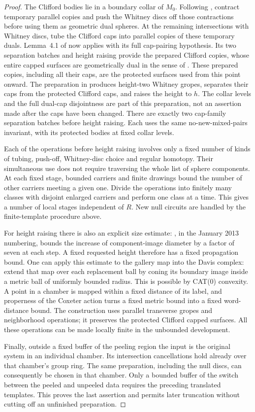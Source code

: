\documentclass[11pt]{article}
\theoremstyle{definition}
\theoremstyle{remark}
\begin{document}
\begin{proof}
The Clifford bodies lie in a boundary collar of $M_0$.  Following
\cite[Section~5]{PRT}, contract temporary parallel copies and push the
Whitney discs off those contractions before using them as geometric
dual spheres.  At the remaining intersections with Whitney discs,
tube the Clifford caps into parallel copies of these temporary duals.
Lemma~4.1 of \cite{PRT}
now applies with its full cap-pairing hypothesis.  Its two separation
batches and height raising provide the prepared Clifford copies,
whose entire capped surfaces are geometrically dual in the sense of
\cite[Definition~3.1]{PRT}.  These prepared copies, including all their
caps, are the protected surfaces used from this point onward.
The preparation in \cite[Lemma~4.1]{PRT} produces height-two Whitney
gropes, separates their caps from the protected Clifford caps, and
raises the height to $h$. The collar levels and the full dual-cap
disjointness are part of this preparation, not an assertion made after
the caps have been changed.
There are exactly two cap-family separation batches before height
raising.  Each uses the same no-new-mixed-pairs invariant, with its
protected bodies at fixed collar levels.

Each of the operations before height raising involves only a fixed
number of kinds of tubing, push-off, Whitney-disc choice and regular
homotopy.  Their simultaneous use does not require traversing the
whole list of sphere components.  At each fixed stage, bounded
carriers and finite drawings bound the number of other carriers
meeting a given one.  Divide the operations into finitely many
classes with disjoint enlarged carriers and perform one class at a
time.  This gives a number of local stages independent of $R$.
New null circuits are handled by the finite-template procedure above.

For height raising there is also an explicit size estimate:
\cite[Section~2.8.3]{FQ}, in the January 2013 numbering, bounds the
increase of component-image diameter by a factor of seven at each
step.  A fixed requested height therefore has a fixed propagation
bound.  One can apply this estimate to the gallery map into the
Davis complex: extend that map over each replacement ball by coning
its boundary image inside a metric ball of uniformly bounded radius.
This is possible by CAT(0) convexity.  A point in a chamber is mapped
within a fixed distance of its label, and properness of the Coxeter
action turns a fixed metric bound into a fixed word-distance bound.
The construction uses parallel transverse gropes and
neighborhood operations; it preserves the protected Clifford capped
surfaces.  All these operations can be made locally finite in the
unbounded development.

Finally, outside a fixed buffer of the peeling region the input is
the original system in an individual chamber.  Its intersection
cancellations hold already over that chamber's group ring.  The same
preparation, including the null discs, can consequently be chosen in
that chamber.  Only a bounded buffer of the switch between the
peeled and unpeeled data requires the preceding translated templates.
This proves the last assertion and permits later truncation without
cutting off an unfinished preparation.
\end{proof}
\end{document}
